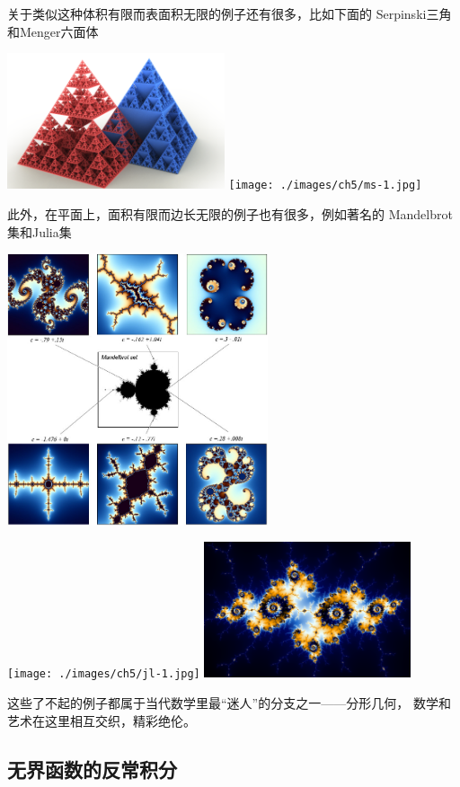 \begin{shaded}
	关于类似这种{\kaishu 体积有限而表面积无限}的例子还有很多，比如下面的
	Serpinski三角和Menger六面体
	\begin{center}
		\includegraphics[height=4cm]{./images/ch5/sp-1.png}
		\texttt{[image: ./images/ch5/ms-1.jpg]}
	\end{center}
	此外，在平面上，{\kaishu 面积有限而边长无限}的例子也有很多，例如著名的
	Mandelbrot集和Julia集
	\begin{center}
		\includegraphics[height=8cm]{./images/ch5/mdbt.jpg}
		
		\texttt{[image: ./images/ch5/jl-1.jpg]}
		\includegraphics[height=4cm]{./images/ch5/mdbt-2.png}
	\end{center}
	这些了不起的例子都属于当代数学里最“迷人”的分支之一——{\kaishu 分形几何}，
	数学和艺术在这里相互交织，精彩绝伦。
\end{shaded}

\subsection{无界函数的反常积分}


